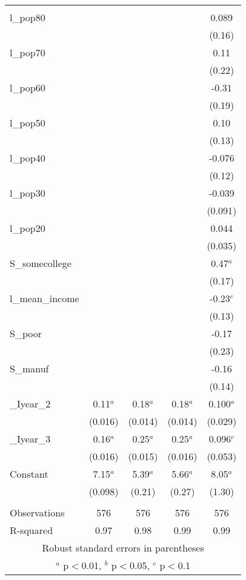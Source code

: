 \documentclass[]{article}
\begin{document}
\begin{tabular}{lcccc}
 &  &  &  &  \\
l\_pop80 &  &  &  & 0.089 \\
 &  &  &  & (0.16) \\
l\_pop70 &  &  &  & 0.11 \\
 &  &  &  & (0.22) \\
l\_pop60 &  &  &  & -0.31 \\
 &  &  &  & (0.19) \\
l\_pop50 &  &  &  & 0.10 \\
 &  &  &  & (0.13) \\
l\_pop40 &  &  &  & -0.076 \\
 &  &  &  & (0.12) \\
l\_pop30 &  &  &  & -0.039 \\
 &  &  &  & (0.091) \\
l\_pop20 &  &  &  & 0.044 \\
 &  &  &  & (0.035) \\
S\_somecollege &  &  &  & 0.47$^a$ \\
 &  &  &  & (0.17) \\
l\_mean\_income &  &  &  & -0.23$^c$ \\
 &  &  &  & (0.13) \\
S\_poor &  &  &  & -0.17 \\
 &  &  &  & (0.23) \\
S\_manuf &  &  &  & -0.16 \\
 &  &  &  & (0.14) \\
\_Iyear\_2 & 0.11$^a$ & 0.18$^a$ & 0.18$^a$ & 0.100$^a$ \\
 & (0.016) & (0.014) & (0.014) & (0.029) \\
\_Iyear\_3 & 0.16$^a$ & 0.25$^a$ & 0.25$^a$ & 0.096$^c$ \\
 & (0.016) & (0.015) & (0.016) & (0.053) \\
Constant & 7.15$^a$ & 5.39$^a$ & 5.66$^a$ & 8.05$^a$ \\
 & (0.098) & (0.21) & (0.27) & (1.30) \\
 &  &  &  &  \\
Observations & 576 & 576 & 576 & 576 \\
 R-squared & 0.97 & 0.98 & 0.99 & 0.99 \\ \hline
\multicolumn{5}{c}{ Robust standard errors in parentheses} \\
\multicolumn{5}{c}{ $^a$ p$<$0.01, $^b$ p$<$0.05, $^c$ p$<$0.1} \\
\end{tabular}
\end{document}
